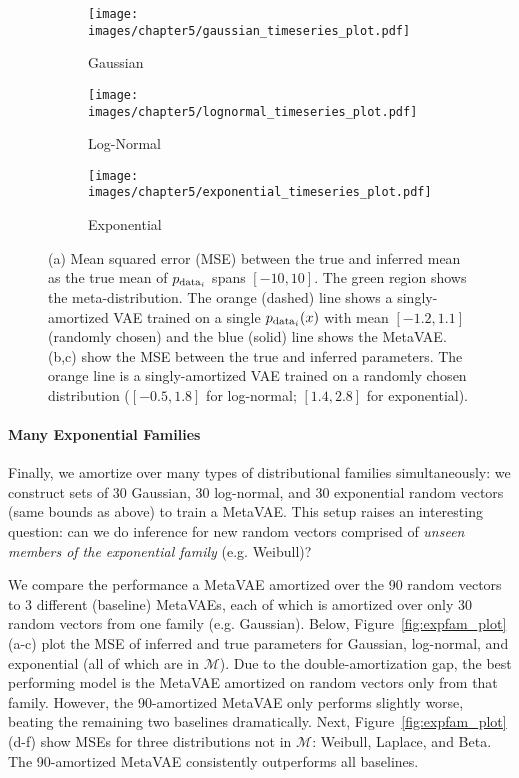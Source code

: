 \begin{figure}
\centering     %
\begin{subfigure}[b]{0.34\linewidth}
    \texttt{[image: images/chapter5/gaussian\_timeseries\_plot.pdf]}
    \caption{Gaussian}
\end{subfigure}
\begin{subfigure}[b]{0.31\linewidth}
    \texttt{[image: images/chapter5/lognormal\_timeseries\_plot.pdf]}
    \caption{Log-Normal}
\end{subfigure}
\begin{subfigure}[b]{0.31\linewidth}
    \texttt{[image: images/chapter5/exponential\_timeseries\_plot.pdf]}
    \caption{Exponential}
\end{subfigure}
\caption{(a) Mean squared error (MSE) between the true and inferred mean as the true mean of $p_{\textup{data}_i}$ spans $[-10, 10]$. The green region shows the  meta-distribution. 
The orange (dashed) line shows a singly-amortized VAE trained on a single $p_{\textup{data}_i}(x)$ with mean $[-1.2, 1.1]$ (randomly chosen) and the blue (solid) line shows the MetaVAE. 
(b,c) show the MSE between the true and inferred parameters. The orange line is a singly-amortized VAE trained on a  randomly chosen distribution ($[-0.5, 1.8]$ for log-normal; $[1.4, 2.8]$ for exponential).}
\label{fig:explognorm_plot}
\end{figure}
\paragraph{Many Exponential Families} 
Finally, we amortize over many types of distributional families simultaneously: we construct sets of 30 Gaussian, 30 log-normal, and 30 exponential random vectors (same bounds as above) to train a MetaVAE. This setup raises an interesting question: can we do inference for new random vectors comprised of \textit{unseen members of the exponential family} (e.g. Weibull)? 

We compare the performance a MetaVAE amortized over the 90 random vectors to 3 different (baseline) MetaVAEs, each of which is amortized over only 30 random vectors from one family (e.g. Gaussian). Below, Figure~\ref{fig:expfam_plot}(a-c) plot the MSE of inferred and true parameters for Gaussian, log-normal, and exponential (all of which are in $\mathcal{M}$). Due to the double-amortization gap, the best performing model is the MetaVAE amortized on random vectors only from that family. However, the 90-amortized MetaVAE only performs slightly worse, beating the remaining two baselines dramatically. Next, Figure~\ref{fig:expfam_plot}(d-f) show MSEs for three distributions not in $\mathcal{M}$: Weibull, Laplace, and Beta. The 90-amortized MetaVAE consistently outperforms all baselines. 

